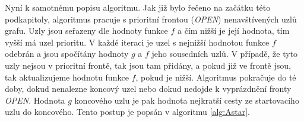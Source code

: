 Nyní k samotnému popisu algoritmu. Jak již bylo řečeno na začátku této podkapitoly, algoritmus pracuje s prioritní frontou (\emph{OPEN}) nenavštívených uzlů grafu. Uzly jsou seřazeny dle hodnoty funkce $f$ a čím nižší je její hodnota, tím vyšší má uzel prioritu. V každé iteraci je uzel s nejnižší hodnotou funkce $f$ odebrán a jsou spočítány hodnoty $g$  a $f$ jeho sousedních uzlů. V případě, že tyto uzly nejsou v prioritní frontě, tak jsou tam přidány, a pokud již ve frontě jsou, tak aktualizujeme hodnotu funkce $f$, pokud je nižší. Algoritmus pokračuje do té doby, dokud nenalezne koncový uzel nebo dokud nedojde k vyprázdnění fronty \emph{OPEN}. Hodnota $g$ koncového uzlu je pak hodnota nejkratší cesty ze startovacího uzlu do koncového. Tento postup je popsán v algoritmu \ref{alg:Astar}.

%
